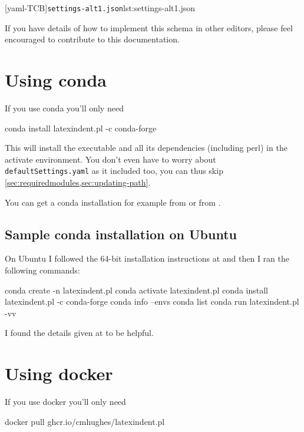   \begin{widepage}
   [yaml-TCB]{\texttt{settings-alt1.json}}{lst:settings-alt1.json}
  \end{widepage}

  If you have details of how to implement this schema in other editors, please feel
  encouraged to contribute to this documentation.

 \section{Using conda}\label{sec:app:conda}
  If you use conda you'll only need

  \begin{commandshell}
conda install latexindent.pl -c conda-forge
\end{commandshell}

  This will install the executable and all its dependencies (including perl) in the
  activate environment. You don't even have to worry about \texttt{defaultSettings.yaml} as
  it included too, you can thus skip \cref{sec:requiredmodules,sec:updating-path}.

  You can get a conda installation for example from \cite{conda} or from \cite{anacoda}.

 \subsection{Sample conda installation on Ubuntu}
  On Ubuntu I followed the 64-bit installation instructions at \cite{condainstallubuntu}
  and then I ran the following commands:

  \begin{commandshell}
conda create -n latexindent.pl
conda activate latexindent.pl
conda install latexindent.pl -c conda-forge
conda info --envs
conda list
conda run latexindent.pl -vv
\end{commandshell}

  I found the details given at \cite{condainstallhelp} to be helpful.

 \section{Using docker}\label{sec:app:docker}
  If you use docker you'll only need 

  \begin{commandshell}
docker pull ghcr.io/cmhughes/latexindent.pl
\end{commandshell}

